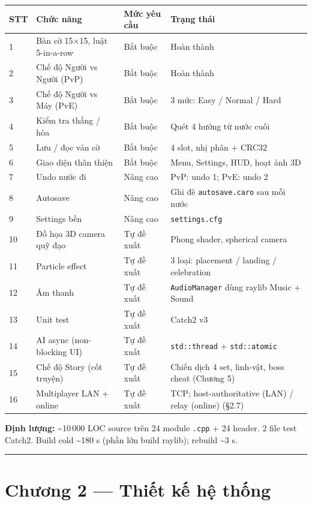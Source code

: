\documentclass[11pt,a4paper]{article}
\begin{document}
\begin{center}
\begin{tabularx}{\textwidth}{lXlX}
STT & Chức năng & Mức yêu cầu & Trạng thái\\
\hline
1 & Bàn cờ 15×15, luật 5-in-a-row & Bắt buộc & Hoàn thành\\
2 & Chế độ Người vs Người (PvP) & Bắt buộc & Hoàn thành\\
3 & Chế độ Người vs Máy (PvE) & Bắt buộc & 3 mức: Easy / Normal / Hard\\
4 & Kiểm tra thắng / hòa & Bắt buộc & Quét 4 hướng từ nước cuối\\
5 & Lưu / đọc ván cờ & Bắt buộc & 4 slot, nhị phân + CRC32\\
6 & Giao diện thân thiện & Bắt buộc & Menu, Settings, HUD, hoạt ảnh 3D\\
7 & Undo nước đi & Nâng cao & PvP: undo 1; PvE: undo 2\\
8 & Autosave & Nâng cao & Ghi đè \texttt{autosave.caro} sau mỗi nước\\
9 & Settings bền & Nâng cao & \texttt{settings.cfg}\\
10 & Đồ họa 3D camera quỹ đạo & Tự đề xuất & Phong shader, spherical camera\\
11 & Particle effect & Tự đề xuất & 3 loại: placement / landing / celebration\\
12 & Âm thanh & Tự đề xuất & \texttt{AudioManager} dùng raylib Music + Sound\\
13 & Unit test & Tự đề xuất & Catch2 v3\\
14 & AI async (non-blocking UI) & Tự đề xuất & \texttt{std::thread} + \texttt{std::atomic}\\
15 & Chế độ Story (cốt truyện) & Tự đề xuất & Chiến dịch 4 set, linh-vật, boss cheat (Chương 5)\\
16 & Multiplayer LAN + online & Tự đề xuất & TCP; host-authoritative (LAN) / relay (online) (§2.7)\\
\end{tabularx}
\end{center}

\textbf{Định lượng:} \textasciitilde{}10\,000 LOC source trên 24 module \texttt{.cpp} + 24 header. 2 file test Catch2. Build cold \textasciitilde{}180 s (phần lớn build raylib); rebuild \textasciitilde{}3 s.

\noindent\rule{\textwidth}{0.5pt}
\section{Chương 2 — Thiết kế hệ thống}
\label{sec:org8d487ac}
\end{document}
